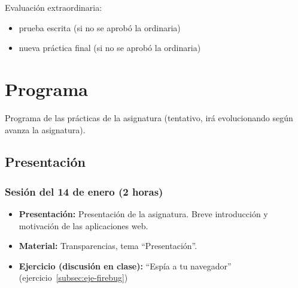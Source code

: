 \documentclass[a4paper,12pt]{report}
\begin{document}
Evaluación extraordinaria:

\begin{itemize}
\item prueba escrita (si no se aprobó la ordinaria)
\item nueva práctica final (si no se aprobó la ordinaria)
\end{itemize}



\chapter{Programa}

Programa de las prácticas de la asignatura (tentativo, irá evolucionando según avanza la asignatura).

\section{Presentación}

\subsection{Sesión del 14 de enero (2 horas)}

\begin{itemize}
\item \textbf{Presentación:} Presentación de la asignatura. Breve introducción y motivación de las aplicaciones web.
\item \textbf{Material:} Transparencias, tema ``Presentación''.
\item \textbf{Ejercicio (discusión en clase):} ``Espía a tu navegador'' (ejercicio~\ref{subsec:eje-firebug})
\end{itemize}
\end{document}
